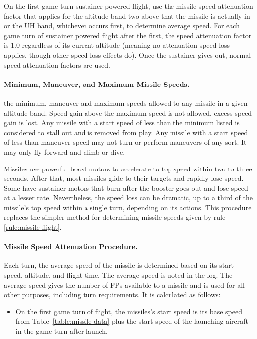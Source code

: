 \begin{advancedrules}
{On the first game turn sustainer powered flight, use the missile speed attenuation factor that applies for the altitude band two above that the missile is actually in or the UH band, whichever occurs first, to determine average speed. For each game turn of sustainer powered flight after the first, the speed attenuation factor is 1.0 regardless of its current altitude (meaning no attenuation speed loss applies, though other speed loss effects do). Once the sustainer gives out, normal speed attenuation factors are used.

\paragraph{Minimum, Maneuver, and Maximum Missile Speeds.}  the minimum, maneuver and maximum speeds allowed to any missile in a given altitude band. Speed gain above the maximum speed is not allowed, excess speed gain is lost. Any missile with a start speed of less than the minimum listed is considered to stall out and is removed from play. Any missile with a start speed of less than maneuver speed may not turn or perform maneuvers of any sort. It may only fly forward and climb or dive.

}{

Missiles use powerful boost motors to accelerate to top speed within two to three seconds. After that, most missiles glide to their targets and rapidly lose speed. Some have sustainer motors that burn after the booster goes out and lose speed at a lesser rate. Nevertheless, the speed loss can be dramatic, up to a third of the missile’s top speed within a single turn, depending on its actions. This procedure replaces the simpler method for determining missile speeds given by rule \ref{rule:missile-flight}.

\paragraph{Missile Speed Attenuation Procedure.}
Each turn, the average speed of the missile is determined based on its start speed, altitude, and flight time. The average speed is noted in the log. The average speed gives the number of FPs available to a missile and is used for all other purposes, including turn requirements. It is calculated as follows:
\begin{itemize}
\item 
On the first game turn of flight, the missiles’s start speed is its base speed from Table~\ref{table:missile-data} plus the start speed of the launching aircraft in the game turn after launch.


\end{itemize}}
\end{advancedrules}

